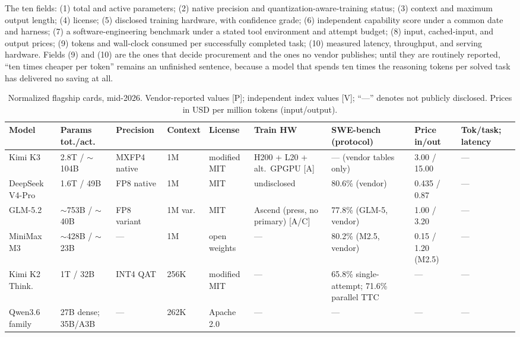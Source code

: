 The ten fields: (1) total and active parameters; (2) native precision and quantization-aware-training status; (3) context and maximum output length; (4) license; (5) disclosed training hardware, with confidence grade; (6) independent capability score under a common date and harness; (7) a software-engineering benchmark under a stated tool environment and attempt budget; (8) input, cached-input, and output prices; (9) tokens and wall-clock consumed per successfully completed task; (10) measured latency, throughput, and serving hardware. Fields (9) and (10) are the ones that decide procurement and the ones no vendor publishes; until they are routinely reported, ``ten times cheaper per token'' remains an unfinished sentence, because a model that spends ten times the reasoning tokens per solved task has delivered no saving at all.

\begin{table}[htbp]
  \centering
  \tiny
  \setlength{\tabcolsep}{3pt}
  \caption{Normalized flagship cards, mid-2026. Vendor-reported values [P]; independent index values [V]; ``---'' denotes not publicly disclosed. Prices in USD per million tokens (input/output).}
  \label{tab:cards}
  \begin{tabular}{p{15mm}p{15mm}p{12mm}p{11mm}p{10mm}p{16mm}p{13mm}p{15mm}p{12mm}}
    \toprule
    Model & Params tot./act. & Precision & Context & License & Train HW & SWE-bench (protocol) & Price in/out & Tok/task; latency \\
    \midrule
    Kimi K3 & 2.8T / $\sim$104B & MXFP4 native & 1M & modified MIT & H200 + L20 + alt.\ GPGPU [A] & --- (vendor tables only) & 3.00 / 15.00 & --- \\
    \addlinespace
    DeepSeek V4-Pro & 1.6T / 49B & FP8 native & 1M & MIT & undisclosed & 80.6\% (vendor) & 0.435 / 0.87 & --- \\
    \addlinespace
    GLM-5.2 & $\sim$753B / $\sim$40B & FP8 variant & 1M var. & MIT & Ascend (press, no primary) [A/C] & 77.8\% (GLM-5, vendor) & 1.00 / 3.20 & --- \\
    \addlinespace
    MiniMax M3 & $\sim$428B / $\sim$23B & --- & 1M & open weights & --- & 80.2\% (M2.5, vendor) & 0.15 / 1.20 (M2.5) & --- \\
    \addlinespace
    Kimi K2 Think. & 1T / 32B & INT4 QAT & 256K & modified MIT & --- & 65.8\% single-attempt; 71.6\% parallel TTC & --- & --- \\
    \addlinespace
    Qwen3.6 family & 27B dense; 35B/A3B & --- & 262K & Apache 2.0 & --- & --- & --- & --- \\
    \bottomrule
  \end{tabular}
\end{table}

